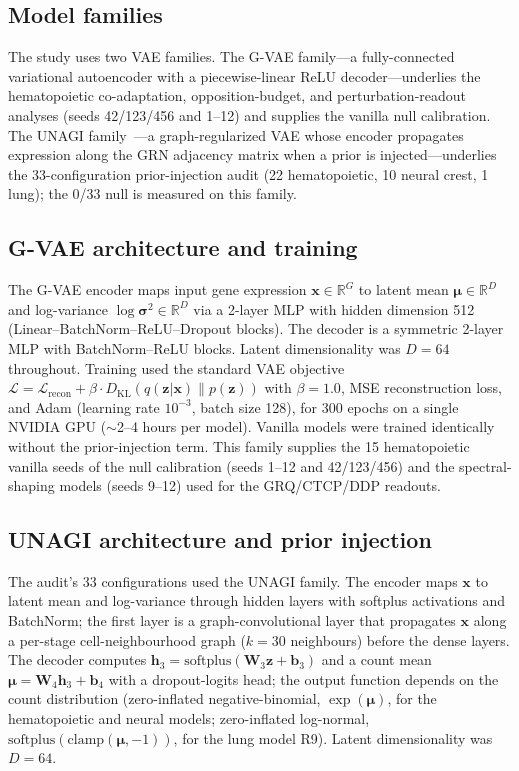 \subsection*{Model families}

The study uses two VAE families. The G-VAE family---a fully-connected variational autoencoder with a piecewise-linear ReLU decoder---underlies the hematopoietic co-adaptation, opposition-budget, and perturbation-readout analyses (seeds 42/123/456 and 1--12) and supplies the vanilla null calibration. The UNAGI family~\cite{unagi}---a graph-regularized VAE whose encoder propagates expression along the GRN adjacency matrix when a prior is injected---underlies the 33-configuration prior-injection audit (22 hematopoietic, 10 neural crest, 1 lung); the 0/33 null is measured on this family.

\subsection*{G-VAE architecture and training}

The G-VAE encoder maps input gene expression $\mathbf{x} \in \mathbb{R}^G$ to latent mean $\boldsymbol{\mu} \in \mathbb{R}^D$ and log-variance $\log\boldsymbol{\sigma}^2 \in \mathbb{R}^D$ via a 2-layer MLP with hidden dimension 512 (Linear--BatchNorm--ReLU--Dropout blocks). The decoder is a symmetric 2-layer MLP with BatchNorm--ReLU blocks. Latent dimensionality was $D=64$ throughout. Training used the standard VAE objective $\mathcal{L} = \mathcal{L}_{\text{recon}} + \beta \cdot D_{\text{KL}}(q(\mathbf{z}|\mathbf{x}) \| p(\mathbf{z}))$ with $\beta=1.0$, MSE reconstruction loss, and Adam (learning rate $10^{-3}$, batch size 128), for 300 epochs on a single NVIDIA GPU ($\sim$2--4 hours per model). Vanilla models were trained identically without the prior-injection term. This family supplies the 15 hematopoietic vanilla seeds of the null calibration (seeds 1--12 and 42/123/456) and the spectral-shaping models (seeds 9--12) used for the GRQ/CTCP/DDP readouts.

\subsection*{UNAGI architecture and prior injection}

The audit's 33 configurations used the UNAGI family. The encoder maps $\mathbf{x}$ to latent mean and log-variance through hidden layers with softplus activations and BatchNorm; the first layer is a graph-convolutional layer that propagates $\mathbf{x}$ along a per-stage cell-neighbourhood graph ($k=30$ neighbours) before the dense layers. The decoder computes $\mathbf{h}_3=\mathrm{softplus}(\mathbf{W}_3\mathbf{z}+\mathbf{b}_3)$ and a count mean $\boldsymbol{\mu}=\mathbf{W}_4\mathbf{h}_3+\mathbf{b}_4$ with a dropout-logits head; the output function depends on the count distribution (zero-inflated negative-binomial, $\exp(\boldsymbol{\mu})$, for the hematopoietic and neural models; zero-inflated log-normal, $\mathrm{softplus}(\mathrm{clamp}(\boldsymbol{\mu},-1))$, for the lung model R9). Latent dimensionality was $D=64$.

